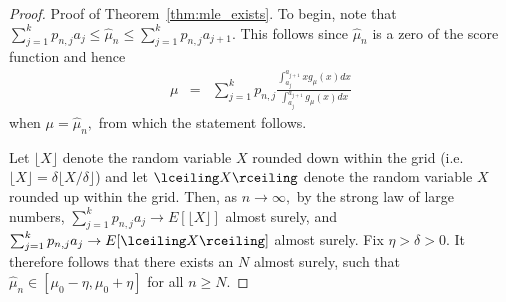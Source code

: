 \documentclass[12pt]{article} %
\begin{document}
\bigskip


\noindent \begin{proof}{Proof of Theorem~\ref{thm:mle_exists}.}
To begin, note that $\sum_{j=1}^k p_{n,j}a_{j} \leq \widehat \mu_n \leq \sum_{j=1}^k p_{n,j}a_{j+1}.$  This follows since $\widehat \mu_n$ is a zero of the score function and hence 
\begin{eqnarray*}
\mu &=& \sum_{j=1}^k p_{n,j} \frac{\int_{a_j}^{a_{j+1}}x g_{\mu}(x)dx}{\int_{a_j}^{a_{j+1}} g_{\mu}(x)dx}
\end{eqnarray*}
when $\mu = \widehat \mu_n,$ from which the statement follows.

Let $\lfloor X \rfloor$ denote the random variable $X$ rounded down within the grid (i.e. $\lfloor X \rfloor = \delta \lfloor X/\delta \rfloor$) and let $\lceiling X \rceiling$ denote the random variable $X$ rounded up within the grid.   Then, as $n\rightarrow \infty,$ by the strong law of large numbers, $\sum_{j=1}^k p_{n,j}a_{j}\rightarrow E[\lfloor X \rfloor]$ almost surely, and $\sum_{j=1}^k p_{n,j}a_{j}\rightarrow E[\lceiling X \rceiling]$ almost surely.  Fix $\eta>\delta>0$.  It therefore follows that there exists an $N$ almost surely, such that $\widehat \mu_n \in [\mu_0-\eta,  \mu_0+\eta]$ for all $n\geq N.$



\end{proof}
\end{document}
